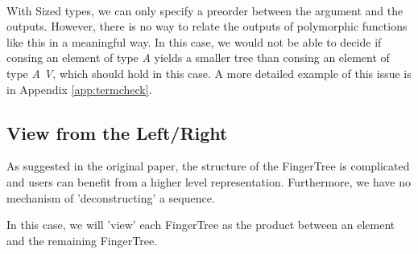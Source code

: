 \documentclass[12pt,twoside,notitlepage]{report}
\begin{document}
\begin{code}
\AgdaSymbol{(}   \AgdaSymbol{)}   \
\end{code} 

With Sized types, we can only specify a preorder between the argument and the outputs. However, there is no way to relate the outputs of polymorphic functions like this in a meaningful way. In this case, we would not be able to decide if consing an element of type \textit{A} yields a smaller tree than consing an element of type  \textit{A V}, which should hold in this case. A more detailed example of this issue is in Appendix \ref{app:termcheck}. 

\subsection{View from the Left/Right}

As suggested in the original paper, the structure of the FingerTree is complicated and users can benefit from a higher level representation. Furthermore, we have no mechanism of 'deconstructing' a sequence.

In this case, we will 'view' each FingerTree as the product between an element and the remaining FingerTree. 
\end{document}
